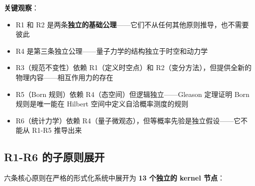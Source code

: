 \textbf{关键观察}：
\begin{itemize}
  \item R1 和 R2 是两条\textbf{独立的基础公理}——它们不从任何其他原则推导，也不需要彼此
  \item R4 是第三条独立公理——量子力学的结构独立于时空和动力学
  \item R3（规范不变性）依赖 R1（定义时空点）和 R2（变分方法），但提供全新的物理内容——相互作用力的存在
  \item R5（Born 规则）依赖 R4（态空间）但逻辑独立——Gleason 定理证明 Born 规则是唯一能在 Hilbert 空间中定义自洽概率测度的规则
  \item R6（统计力学）依赖 R4（量子微观态），但等概率先验是独立假设——它不能从 R1-R5 推导出来
\end{itemize}

\subsection{R1-R6 的子原则展开}

六条核心原则在严格的形式化系统中展开为 \textbf{13 个独立的 kernel 节点}：

